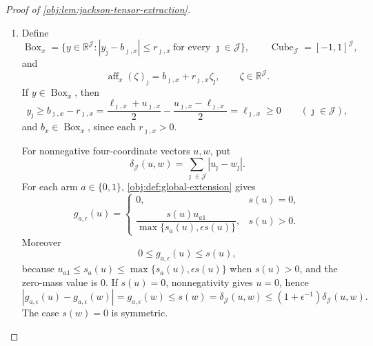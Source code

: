 \documentclass[11pt]{article}
\begin{document}
\begin{proof}[Proof of \cref{obj:lem:jackson-tensor-extraction}]
\begin{enumerate}
\item Define
\[
\operatorname{Box}_x
=
\{y\in\mathbb R^{\mathcal J}: |y_\jmath-b_{\jmath,x}|\le r_{\jmath,x}
\ \text{for every }\jmath\in\mathcal J\},
\qquad
\operatorname{Cube}_{\mathcal J}=[-1,1]^{\mathcal J},
\]
and
\[
\operatorname{aff}_x(\zeta)_\jmath
=
b_{\jmath,x}+r_{\jmath,x}\zeta_\jmath,
\qquad
\zeta\in\mathbb R^{\mathcal J}.
\]
If \(y\in\operatorname{Box}_x\), then
\[
y_\jmath\ge b_{\jmath,x}-r_{\jmath,x}
=
\frac{\ell_{\jmath,x}+u_{\jmath,x}}2
-
\frac{u_{\jmath,x}-\ell_{\jmath,x}}2
=
\ell_{\jmath,x}\ge0
\qquad(\jmath\in\mathcal J),
\]
and \(b_x\in\operatorname{Box}_x\), since each \(r_{\jmath,x}>0\).

For nonnegative four-coordinate vectors \(u,w\), put
\[
\delta_{\mathcal J}(u,w)
=
\sum_{\jmath\in\mathcal J}|u_\jmath-w_\jmath|.
\]
For each arm \(a\in\{0,1\}\), \cref{obj:def:global-extension} gives
\[
g_{a,\epsilon}(u)
=
\begin{cases}
0, & s(u)=0,\\[2mm]
\dfrac{s(u)u_{a1}}{\max\{s_a(u),\epsilon s(u)\}}, & s(u)>0.
\end{cases}
\]
Moreover
\[
0\le g_{a,\epsilon}(u)\le s(u),
\]
because \(u_{a1}\le s_a(u)\le \max\{s_a(u),\epsilon s(u)\}\) when \(s(u)>0\), and the zero-mass value is \(0\). If \(s(u)=0\), nonnegativity gives \(u=0\), hence
\[
|g_{a,\epsilon}(u)-g_{a,\epsilon}(w)|
=
g_{a,\epsilon}(w)
\le s(w)
=
\delta_{\mathcal J}(u,w)
\le (1+\epsilon^{-1})\delta_{\mathcal J}(u,w).
\]
The case \(s(w)=0\) is symmetric.


\end{enumerate}
\end{proof}
\end{document}
